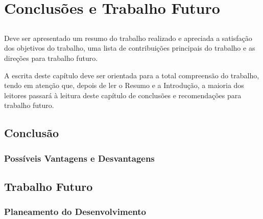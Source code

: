 \chapter{Conclusões e Trabalho Futuro} \label{chap:concl}

\section*{}

Deve ser apresentado um resumo do trabalho realizado e apreciada a
satisfação dos objetivos do trabalho, uma lista de contribuições
principais do trabalho e as direções para trabalho futuro.

A escrita deste capítulo deve ser orientada para a total compreensão
do trabalho, tendo em atenção que, depois de ler o Resumo e a
Introdução, a maioria dos leitores passará à leitura deste capítulo de
conclusões e recomendações para trabalho futuro.

\section{Conclusão}

\subsection{Possíveis Vantagens e Desvantagens}

\section{Trabalho Futuro}

\subsection{Planeamento do Desenvolvimento}

\vspace*{12mm} 
